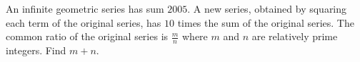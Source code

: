 An infinite geometric series has sum $2005$. A new series, obtained by squaring each term of the original series, has $10$ times the sum of the original series. The common ratio of the original series is $\frac{m}{n}$ where $m$ and $n$ are relatively prime integers. Find $m+n$.